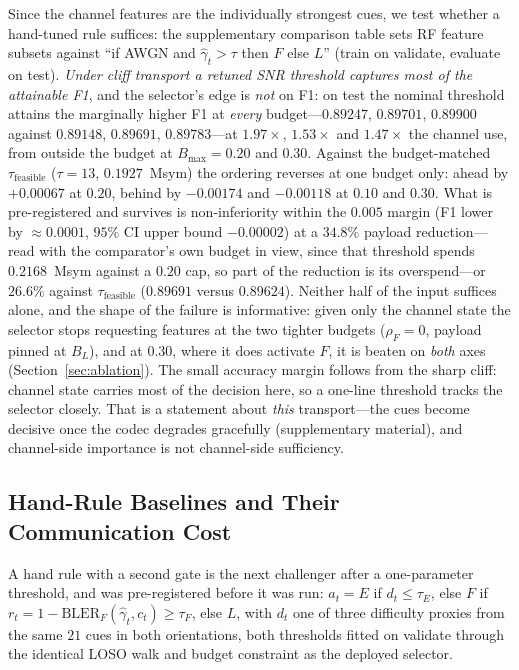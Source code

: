 \documentclass[journal]{IEEEtran}
\begin{document}
Since the channel features are the individually strongest cues, we test whether a hand-tuned rule suffices: the supplementary comparison table sets RF feature subsets against ``if AWGN and $\hat\gamma_t>\tau$ then $F$ else $L$'' (train on validate, evaluate on test). \emph{Under cliff transport a retuned SNR threshold captures most of the attainable F1}, and the selector's edge is \emph{not} on F1: on test the nominal threshold attains the marginally higher F1 at \emph{every} budget---$0.89247$, $0.89701$, $0.89900$ against $0.89148$, $0.89691$, $0.89783$---at $1.97\times$, $1.53\times$ and $1.47\times$ the channel use, from outside the budget at $B_{\max}=0.20$ and $0.30$. Against the budget-matched $\tau_{\mathrm{feasible}}$ ($\tau=13$, $0.1927$~Msym) the ordering reverses at one budget only: ahead by $+0.00067$ at $0.20$, behind by $-0.00174$ and $-0.00118$ at $0.10$ and $0.30$. What is pre-registered and survives is non-inferiority within the $0.005$ margin (F1 lower by ${\approx}0.0001$, $95\%$ CI upper bound $-0.00002$) at a $34.8\%$ payload reduction---read with the comparator's own budget in view, since that threshold spends $0.2168$~Msym against a $0.20$ cap, so part of the reduction is its overspend---or $26.6\%$ against $\tau_{\mathrm{feasible}}$ ($0.89691$ versus $0.89624$). Neither half of the input suffices alone, and the shape of the failure is informative: given only the channel state the selector stops requesting features at the two tighter budgets ($\rho_F=0$, payload pinned at $B_L$), and at $0.30$, where it does activate $F$, it is beaten on \emph{both} axes (Section~\ref{sec:ablation}). The small accuracy margin follows from the sharp cliff: channel state carries most of the decision here, so a one-line threshold tracks the selector closely. That is a statement about \emph{this} transport---the cues become decisive once the codec degrades gracefully (supplementary material), and channel-side importance is not channel-side sufficiency. 

\subsection{Hand-Rule Baselines and Their Communication Cost}\label{sec:handrule}

A hand rule with a second gate is the next challenger after a one-parameter threshold, and was pre-registered before it was run: $a_t=E$ if $d_t\le\tau_E$, else $F$ if $r_t=1-\mathrm{BLER}_F(\hat\gamma_t,c_t)\ge\tau_F$, else $L$, with $d_t$ one of three difficulty proxies from the same $21$ cues in both orientations, both thresholds fitted on validate through the identical LOSO walk and budget constraint as the deployed selector.
\end{document}
